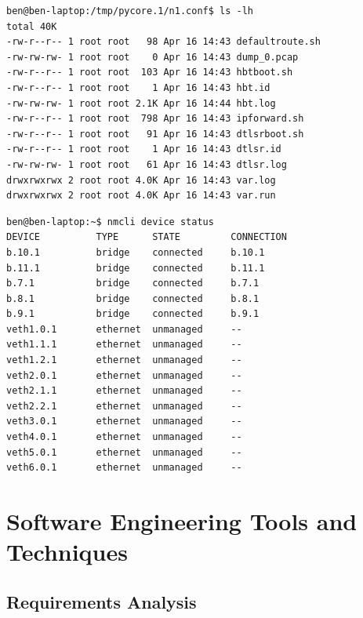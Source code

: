 \documentclass[withindex,glossary,openany]{cam-thesis}
\begin{document}
\begin{minipage}{1\textwidth} \centering
\begin{lstlisting}[label=core_filesystem, frame=tb, caption=Example of a virtualised file-system]
ben@ben-laptop:/tmp/pycore.1/n1.conf$ ls -lh
total 40K
-rw-r--r-- 1 root root   98 Apr 16 14:43 defaultroute.sh
-rw-rw-rw- 1 root root    0 Apr 16 14:43 dump_0.pcap
-rw-r--r-- 1 root root  103 Apr 16 14:43 hbtboot.sh
-rw-r--r-- 1 root root    1 Apr 16 14:43 hbt.id
-rw-rw-rw- 1 root root 2.1K Apr 16 14:44 hbt.log
-rw-r--r-- 1 root root  798 Apr 16 14:43 ipforward.sh
-rw-r--r-- 1 root root   91 Apr 16 14:43 dtlsrboot.sh
-rw-r--r-- 1 root root    1 Apr 16 14:43 dtlsr.id
-rw-rw-rw- 1 root root   61 Apr 16 14:43 dtlsr.log
drwxrwxrwx 2 root root 4.0K Apr 16 14:43 var.log
drwxrwxrwx 2 root root 4.0K Apr 16 14:43 var.run
\end{lstlisting}
\end{minipage}

\begin{minipage}{1\textwidth} \centering
\begin{lstlisting}[label=core_interfaces, frame=tb, caption=Virtualised network interfaces and bridges]
ben@ben-laptop:~$ nmcli device status
DEVICE          TYPE      STATE         CONNECTION
b.10.1          bridge    connected     b.10.1
b.11.1          bridge    connected     b.11.1
b.7.1           bridge    connected     b.7.1
b.8.1           bridge    connected     b.8.1
b.9.1           bridge    connected     b.9.1
veth1.0.1       ethernet  unmanaged     --
veth1.1.1       ethernet  unmanaged     --
veth1.2.1       ethernet  unmanaged     --
veth2.0.1       ethernet  unmanaged     --
veth2.1.1       ethernet  unmanaged     --
veth2.2.1       ethernet  unmanaged     --
veth3.0.1       ethernet  unmanaged     --
veth4.0.1       ethernet  unmanaged     --
veth5.0.1       ethernet  unmanaged     --
veth6.0.1       ethernet  unmanaged     --
\end{lstlisting}
\end{minipage}

\section{Software Engineering Tools and Techniques}

\subsection{Requirements Analysis}
\end{document}
